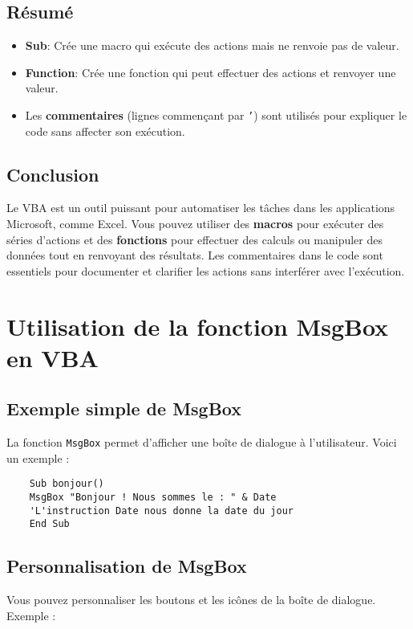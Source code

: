 \documentclass[a4paper,12pt]{report}
\begin{document}
	\section{Résumé}
	\begin{itemize}
		\item \textbf{Sub}: Crée une macro qui exécute des actions mais ne renvoie pas de valeur.
		\item \textbf{Function}: Crée une fonction qui peut effectuer des actions et renvoyer une valeur.
		\item Les \textbf{commentaires} (lignes commençant par \texttt{'}) sont utilisés pour expliquer le code sans affecter son exécution.
	\end{itemize}
	
	\section{Conclusion}
	Le VBA est un outil puissant pour automatiser les tâches dans les applications Microsoft, comme Excel. Vous pouvez utiliser des \textbf{macros} pour exécuter des séries d'actions et des \textbf{fonctions} pour effectuer des calculs ou manipuler des données tout en renvoyant des résultats. Les commentaires dans le code sont essentiels pour documenter et clarifier les actions sans interférer avec l'exécution.
	
\chapter{Utilisation de la fonction MsgBox en VBA}

\section{Exemple simple de MsgBox}
La fonction \texttt{MsgBox} permet d'afficher une boîte de dialogue à l'utilisateur. Voici un exemple :

\begin{lstlisting}
	Sub bonjour()
	MsgBox "Bonjour ! Nous sommes le : " & Date
	'L'instruction Date nous donne la date du jour
	End Sub
\end{lstlisting}

\section{Personnalisation de MsgBox}
Vous pouvez personnaliser les boutons et les icônes de la boîte de dialogue. Exemple :
\end{document}
